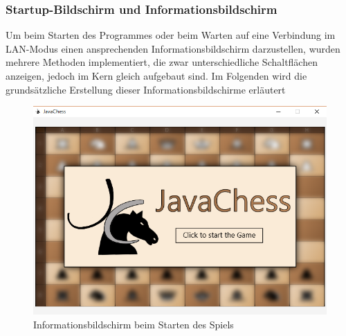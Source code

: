 \documentclass[12pt,a4paper]{article}
\begin{document}
\subsubsection{Startup-Bildschirm und Informationsbildschirm}
\label{SUBSUBSEC:BLURRYMENU}
Um beim Starten des Programmes oder beim Warten auf eine Verbindung im LAN-Modus einen ansprechenden Informationsbildschirm darzustellen, wurden mehrere Methoden implementiert, die zwar unterschiedliche Schaltflächen anzeigen, jedoch im Kern gleich aufgebaut sind. Im Folgenden wird die grundsätzliche Erstellung dieser Informationsbildschirme erläutert\\
\begin{figure}[H]
  \centering
   	\includegraphics[width=14cm]{graphics/Startup.png}
  \caption{Informationsbildschirm beim Starten des Spiels}
  \label{fig:Startup}
\end{figure}
\end{document}
